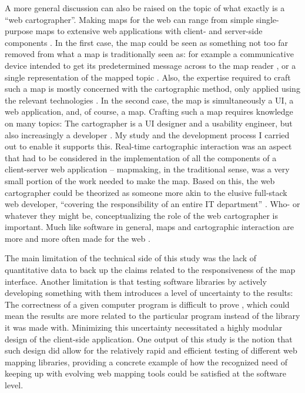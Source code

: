 A more general discussion can also be raised on the topic of what exactly is
a \enquote{web cartographer}.
Making maps for the web can range from simple
single-purpose maps to extensive web applications with
client- and server-side components \parencite{vee2017, mai2017}.
In the first case,
the map could be seen as something not too far removed from
what a map is traditionally seen as: for example a communicative
device intended to get its predetermined message across to the map reader
\parencite{kol1969},
or a single representation of the mapped topic \parencite{tyn1992}.
Also, the expertise required to craft such a map is mostly concerned with
the cartographic method, only applied using the relevant technologies \parencite{rot2021}.
In the second case,
the map is simultaneously a UI, a web application, and, of course, a map.
Crafting such a map requires knowledge on many topics:
The cartographer is a UI designer and a usability engineer,
but also increasingly a developer \parencite{rot2017, mai2017}.
My study and the development process I carried out to enable it supports this.
Real-time cartographic interaction was an aspect that had to be considered
in the implementation of all the components of a client-server web application --
mapmaking, in the traditional sense, was a very small portion of the work
needed to make the map.
Based on this,
the web cartographer could be theorized as
someone more akin to the elusive full-stack web developer,
\enquote{covering the responsibility of an entire IT
department} \parencite[p.~370]{tai2021}.
Who- or whatever they might be, conceptualizing the role of the web cartographer is important.
Much like software in general, maps and cartographic interaction
are more and more often made for the web \parencite{tai2017, rot2021, vee2017}.

The main limitation of the technical side of this study
was the lack of quantitative data to back up
the claims related to the responsiveness of the map interface.
Another limitation is that testing software libraries by
actively developing something with them introduces
a level of uncertainty to the results:
The correctness of a given computer program is difficult to prove
\parencite{dij1970, amm2016},
which could mean the results are more related to the particular program
instead of the library it was made with.
Minimizing this uncertainty necessitated
a highly modular design of the client-side application.
One output of this study is the notion that such design did allow for
the relatively rapid and efficient testing of different web mapping libraries,
providing a concrete example of
how the recognized need of keeping up with evolving web mapping tools \parencite{rot2014, rot2021}
could be satisfied at the software level.




